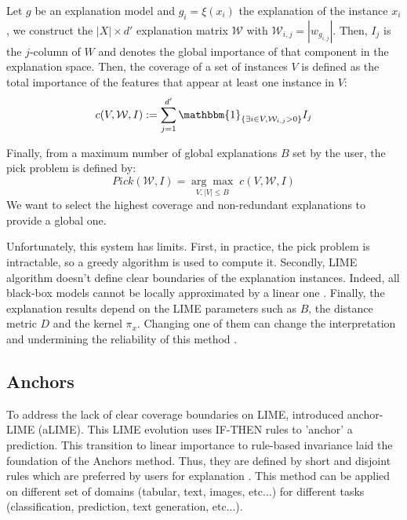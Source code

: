 \begin{definition}[Coverage]
    Let $g$ be an explanation model and $ g_i = \xi(x_i)$ the explanation 
    of the instance $x_i$, we construct the $|X| \times d'$ explanation matrix $ \mathcal{W}$ 
    with $ \mathcal{W}_{i,j} = | w_{g_{i,j}} |$. Then, $I_j$ is the $j$-column of 
    $W$ and denotes the global importance of that component in the explanation space. 
    Then, the coverage of a set of instances $V$ is defined as the total importance 
    of the features that appear at least one instance in $V$: 
    \begin{equation}
        c(V, \mathcal{W}, I) := \sum_{j=1}^{d'} \mathbbm{1}_{\{ \exists i \in V, \mathcal{W}_{i,j} > 0\}} I_j  
    \end{equation}
\end{definition}

Finally, from a maximum number of global explanations $B$ set by the user, the 
pick problem is defined by:
    \begin{equation} \label{eq:}
        Pick( \mathcal{W},I) = \underset{V, |V| \leqslant B}{\arg \max} \; c(V, \mathcal{W}, I) 
    \end{equation}
We want to select the highest coverage and non-redundant explanations to provide a global 
one. 


Unfortunately, this system has limits. First, in practice, the pick problem is intractable, 
so a greedy algorithm is used to compute it. 
Secondly, LIME algorithm doesn't define clear boundaries of the explanation instances. Indeed, 
all black-box models cannot be locally approximated by a linear one \cite{ribeiro_nothing_2016}. 
Finally, the explanation results depend on the LIME parameters such as $B$, the distance metric 
$D$ and the kernel $ \pi_x$. Changing one of them can change the interpretation and 
undermining the reliability of this method \cite{wilking_fooling_2022}.

\subsection{Anchors}

To address the lack of clear coverage boundaries on LIME, \textcite{ribeiro_nothing_2016}
introduced anchor-LIME (aLIME). This LIME evolution uses IF-THEN rules to 'anchor'
a prediction. This transition to linear importance to rule-based invariance laid the foundation 
of the Anchors method. Thus, they are defined by short and 
disjoint rules which are preferred by users for explanation \cite{ribeiro_anchors_2018}. This method can be applied 
on different set of domains (tabular, text, images, etc...) for different 
tasks (classification, prediction, text generation, etc...).

